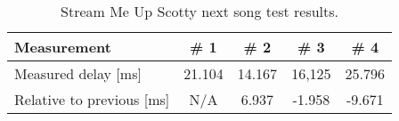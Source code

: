 \begin{table}[ht]
    \centering
    \begin{tabularx}{0.75\textwidth}{Xcccc}
        \toprule
        Measurement                 & \# 1      & \# 2      & \# 3     & \# 4     \\\midrule
        Measured delay [ms]         & 21.104    & 14.167    & 16,125   & 25.796   \\
        Relative to previous [ms]   & N/A       & 6.937     & -1.958   & -9.671   \\\bottomrule
    \end{tabularx}
    \caption{Stream Me Up Scotty next song test results.}\label{fig:smus_pause_resume}
\end{table}
